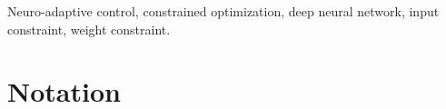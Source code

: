 \documentclass[letterpaper, journal]{IEEEtran}
\begin{document}
\begin{IEEEkeywords}
    Neuro-adaptive control, constrained optimization, deep neural network, input constraint, weight constraint.
\end{IEEEkeywords}

\section*{Notation}


\end{document}
